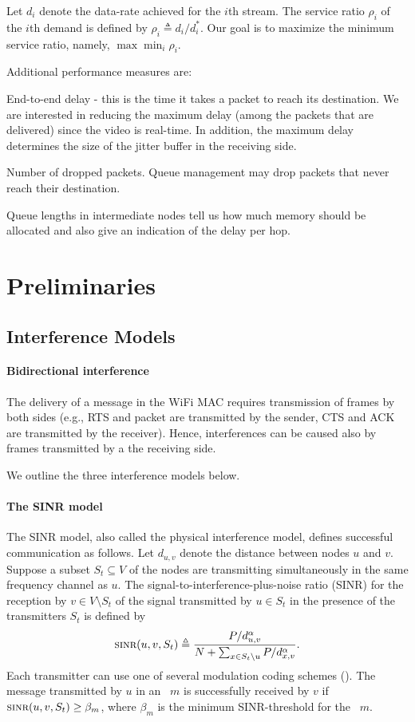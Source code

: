 \documentclass[12pt]{article}
\newenvironment{proof sketch}[1]{\noindent {\emph{Proof sketch of #1:}}}{\hfill \qed}
\newcommand{\eqdf}{\triangleq}
\newcommand{\SINR}{\text{\sc{sinr}}}
\newcommand{\MCS}{\text{\sc{mcs}}}
\begin{document}
Let $d_i$ denote the data-rate achieved for the $i$th stream.  The
service ratio $\rho_i$ of the $i$th demand is defined by $\rho_i \eqdf
d_i/d^*_i$.  Our goal is to maximize the minimum service ratio,
namely, $\max \min_i \rho_i$.

Additional performance measures are:
\begin{inparaenum}[(i)]
\item End-to-end delay - this is the time it takes a packet to reach
  its destination. We are interested in reducing the maximum delay
  (among the packets that are delivered) since the video is real-time.
  In addition, the maximum delay determines the size of the jitter
  buffer in the receiving side.
\item Number of dropped packets. Queue management may drop packets
  that never reach their destination.
\item Queue lengths in intermediate nodes tell us how much memory
  should be allocated and also give an indication of the delay per hop.
\end{inparaenum}

\section{Preliminaries}
\label{sec:prelim}

\subsection{Interference Models}

\paragraph{Bidirectional interference}
The delivery of a message in the WiFi MAC requires transmission of
frames by both sides (e.g., RTS and packet are transmitted by the
sender, CTS and ACK are transmitted by the receiver). Hence,
interferences can be caused also by frames transmitted by a the
receiving side.

\noindent
We outline the three interference models below.
\paragraph{The SINR model}
The SINR model, also called the physical
interference model, defines successful communication as follows.  Let
$d_{u,v}$ denote the distance between nodes $u$ and $v$.  Suppose a subset
$S_t\subseteq V$ of the nodes are transmitting simultaneously in the
same frequency channel as $u$.  The signal-to-interference-plus-noise
ratio (SINR) for the reception by $v\in V\setminus S_t$ of the signal
transmitted by $u\in S_t$ in the presence of the transmitters $S_t$ is
defined by
\[
\SINR(u,v,S_t) \eqdf \frac{P/d_{u,v}^{\alpha}}{N+\sum_{x\in
    S_t\setminus{u}} P/d_{x,v}^{\alpha}}.
\]
Each transmitter can use one of several modulation coding schemes (\MCS).
The message transmitted by $u$ in an \MCS\ $m$ is successfully received by
$v$ if $\SINR(u,v,S_t)\geq \beta_m$, where $\beta_m$ is the minimum
SINR-threshold for the \MCS\ $m$.
\end{document}
